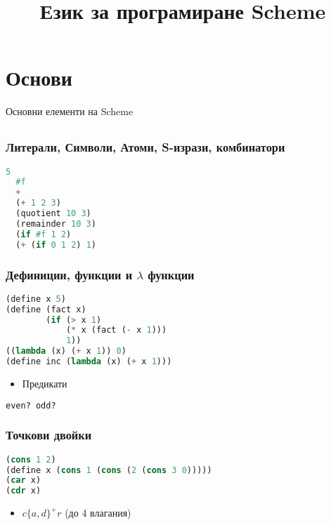\documentclass{beamer}
\begin{document}
\title[Scheme]{Език за програмиране Scheme}
\frame{\titlepage}

\section{Основи}

\begin{frame}
  \centerline{Основни елементи на Scheme}
\end{frame}


\subsection{}

\begin{frame}[fragile]
\frametitle{Литерали, Символи, Атоми, S-изрази, комбинатори}

\begin{lstlisting}[basicstyle=\small\ttfamily,language=Lisp]
  5
  #f
  +
  (+ 1 2 3)
  (quotient 10 3)
  (remainder 10 3)
  (if #f 1 2)
  (+ (if 0 1 2) 1)
\end{lstlisting}

\end{frame}


\begin{frame}[fragile]
\frametitle{Дефиниции, функции и $\lambda$ функции}

\begin{lstlisting}[language=Lisp]
(define x 5)
(define (fact x) 
        (if (> x 1) 
            (* x (fact (- x 1))) 
            1))
((lambda (x) (+ x 1)) 0)
(define inc (lambda (x) (+ x 1)))
\end{lstlisting}
\begin{itemize}
  \item Предикати
\end{itemize}

\begin{lstlisting}[language=Lisp]
  even? odd?
\end{lstlisting}

\end{frame}


\begin{frame}[fragile]
\frametitle{Точкови двойки}

\begin{lstlisting}[language=Lisp]
(cons 1 2)
(define x (cons 1 (cons (2 (cons 3 0)))))
(car x)
(cdr x)
\end{lstlisting}
\begin{itemize}
  \item $c\{a,d\}^+r$ (до 4 влагания)
\end{itemize}

\end{frame}
\end{document}
